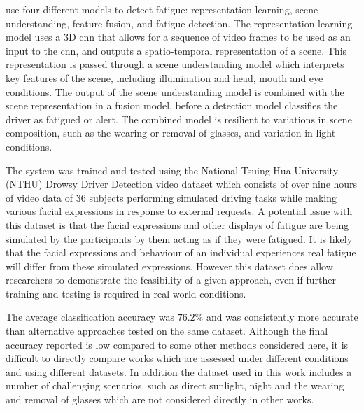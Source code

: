 \documentclass[11pt, parskip=half*,twoside=false]{scrbook}
\begin{document}

\citet{yuDriverDrowsinessDetection2019} use four different models to detect fatigue: representation learning, scene understanding, feature fusion, and fatigue detection. The representation learning model uses a 3D \gls{cnn} that allows for a sequence of video frames to be used as an input to the \gls{cnn}, and outputs a spatio-temporal representation of a scene. This representation is passed through a scene understanding model which interprets key features of the scene, including illumination and head, mouth and eye conditions. The output of the scene understanding model is combined with the scene representation in a fusion model, before a detection model classifies the driver as fatigued or alert. The combined model is resilient to variations in scene composition, such as the wearing or removal of glasses, and variation in light conditions. 
 
The system was trained and tested using the National Tsuing Hua University (NTHU) Drowsy Driver Detection video dataset \citep{wengDriverDrowsinessDetection2017} which consists of over nine hours of video data of 36 subjects performing simulated driving tasks while making various facial expressions in response to external requests. A potential issue with this dataset is that the facial expressions and other displays of fatigue are being simulated by the participants by them acting as if they were fatigued. It is likely that the facial expressions and behaviour of an individual experiences real fatigue will differ from these simulated expressions. However this dataset does allow researchers to demonstrate the feasibility of a given approach, even if further training and testing is required in real-world conditions.

The average classification accuracy was $76.2\%$ and was consistently more accurate than alternative approaches tested on the same dataset. Although the final accuracy reported is low compared to some other methods considered here, it is difficult to directly compare works which are assessed under different conditions and using different datasets. In addition the dataset used in this work includes a number of challenging scenarios, such as direct sunlight, night and the wearing and removal of glasses which are not considered directly in other works.
\end{document}
